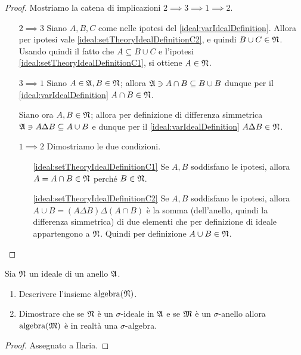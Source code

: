 \documentclass[../EserciziIstituzioniAnalisi.tex]{subfiles}
\begin{document}
\begin{proof}
  Mostriamo la catena di implicazioni $2\implies 3\implies 1\implies 2$.
  \begin{itemize}
    \item[$2\implies 3$] Siano $A,B,C$ come nelle ipotesi del \cref{ideal:varIdealDefinition}. Allora per ipotesi vale \ref{ideal:setTheoryIdealDefinitionC2}, e quindi $B\cup C\in \mathfrak N$.
    Usando quindi il fatto che $A\subseteq B\cup C$ e l'ipotesi \ref{ideal:setTheoryIdealDefinitionC1}, si ottiene $A\in \mathfrak N$.
    \item[$3\implies 1$] Siano $A\in\mathfrak A, B\in\mathfrak N$; allora $\mathfrak A\ni A\cap B\subseteq B\cup B$ dunque per il \cref{ideal:varIdealDefinition} $A\cap B\in\mathfrak N$.
    
    Siano ora $A,B\in\mathfrak N$; allora per definizione di differenza simmetrica $\mathfrak A\ni A\Delta B\subseteq A\cup B$ e dunque per il \cref{ideal:varIdealDefinition} $A\Delta B\in\mathfrak N$.
    \item[$1\implies 2$] Dimostriamo le due condizioni.
    \begin{itemize}
      \item[\ref{ideal:setTheoryIdealDefinitionC1}] Se $A,B$ soddisfano le ipotesi, allora $A=A\cap B\in\mathfrak N$ perché $B\in\mathfrak N$.
      \item[\ref{ideal:setTheoryIdealDefinitionC2}] Se $A,B$ soddisfano le ipotesi, allora $A\cup B=(A\Delta B)\Delta (A\cap B)$ è la somma (dell'anello, quindi la differenza simmetrica) di due elementi che per definizione di ideale appartengono a $\mathfrak N$. Quindi per definizione $A\cup B\in\mathfrak N$. 
    \end{itemize}
  \end{itemize}
\end{proof}

\begin{exercise}[13/10/2016]
  Sia $\mathfrak N$ un ideale di un anello $\mathfrak A$.
\begin{enumerate}
\item Descrivere l'insieme $\operatorname{algebra}(\mathfrak N)$.
\item Dimostrare che se $\mathfrak N$ è un $\sigma$-ideale in $\mathfrak A$ e se $\mathfrak M$ è un $\sigma$-anello allora $\operatorname{algebra}(\mathfrak M)$ è in realtà una $\sigma$-algebra.
\end{enumerate}
\end{exercise}
\begin{proof}
  Assegnato a Ilaria.
\end{proof}
\end{document}
